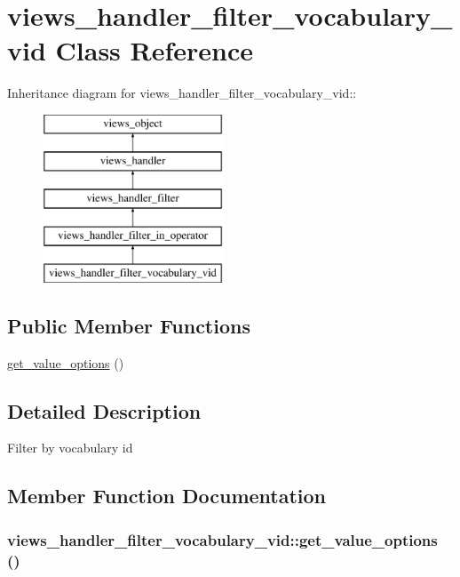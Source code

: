 \hypertarget{classviews__handler__filter__vocabulary__vid}{
\section{views\_\-handler\_\-filter\_\-vocabulary\_\-vid Class Reference}
\label{classviews__handler__filter__vocabulary__vid}
}
Inheritance diagram for views\_\-handler\_\-filter\_\-vocabulary\_\-vid::\begin{figure}[H]
\begin{center}
\leavevmode
\includegraphics[height=5cm]{classviews__handler__filter__vocabulary__vid}
\end{center}
\end{figure}
\subsection*{Public Member Functions}
\begin{CompactItemize}
\item 
\hyperlink{classviews__handler__filter__vocabulary__vid_f4ac6b0c4da1408c4a96e096412eae3a}{get\_\-value\_\-options} ()
\end{CompactItemize}


\subsection{Detailed Description}
Filter by vocabulary id 

\subsection{Member Function Documentation}
\hypertarget{classviews__handler__filter__vocabulary__vid_f4ac6b0c4da1408c4a96e096412eae3a}{
\subsubsection[{get\_\-value\_\-options}]{\setlength{\rightskip}{0pt plus 5cm}views\_\-handler\_\-filter\_\-vocabulary\_\-vid::get\_\-value\_\-options ()}}
\label{classviews__handler__filter__vocabulary__vid_f4ac6b0c4da1408c4a96e096412eae3a}


